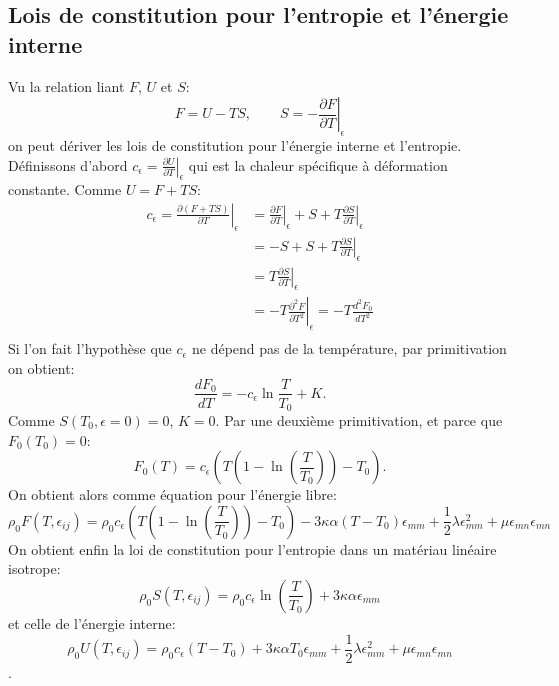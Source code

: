 \subsection{Lois de constitution pour l'entropie et l'énergie interne}
Vu la relation liant $F$, $U$ et $S$:
$$F= U-TS,\qquad S=-\left.\frac{\partial F}{\partial T}\right|_\epsilon$$
on peut dériver les lois de constitution pour l'énergie interne et l'entropie. Définissons d'abord $c_\epsilon=\left.\frac{\partial U}{\partial T}\right|_\epsilon$ qui est la chaleur spécifique à déformation constante. Comme $U=F+TS$:
\begin{align*}
c_{\epsilon}=\left.\frac{\partial (F+TS)}{\partial T}\right|_{\epsilon}&=\left.\frac{\partial F}{\partial T}\right|_{\epsilon}+S+T\left.\frac{\partial S}{\partial T}\right|_\epsilon\\
 &=-S+S+T\left.\frac{\partial S}{\partial T}\right|_\epsilon\\
 &=T\left.\frac{\partial S}{\partial T}\right|_{\epsilon}\\
 &=-T\left.\frac{\partial^2 F}{\partial T^2}\right|_{\epsilon}=-T\frac{d^2F_0}{dT^2}\\
\end{align*}
Si l'on fait l'hypothèse que $c_{\epsilon}$ ne dépend pas de la température, par primitivation on obtient:
$$\frac{dF_0}{dT}=-c_{\epsilon}\ln{\frac{T}{T_0}}+K.$$ Comme $S(T_0,\epsilon=0)=0$, $K=0$. Par une deuxième primitivation, et parce que $F_0(T_0)=0$:
$$F_0(T)=c_{\epsilon}\left(T\left(1-\ln\left(\frac{T}{T_0}\right)\right)-T_0\right).$$
On obtient alors comme équation pour l'énergie libre:
$$\rho_0F(T,\epsilon_{ij})=\rho_0c_{\epsilon}\left(T\left(1-\ln\left(\frac{T}{T_0}\right)\right)-T_0\right)-3\kappa\alpha(T-T_0)\epsilon_{mm}+\frac{1}{2}\lambda\epsilon_{mm}^2+\mu\epsilon_{mn}\epsilon_{mn}$$
On obtient enfin la loi de constitution pour l'entropie dans un matériau linéaire isotrope:
$$\boxed{\rho_0S(T,\epsilon_{ij})=\rho_0c_{\epsilon}\ln\left(\frac{T}{T_0}\right)+3\kappa\alpha\epsilon_{mm}}$$
et celle de l'énergie interne:
$$\boxed{\rho_0U(T,\epsilon_{ij})=\rho_0c_\epsilon(T-T_0)+3\kappa\alpha T_0\epsilon_{mm}+\frac{1}{2}\lambda \epsilon_{mm}^2+\mu\epsilon_{mn}\epsilon_{mn}}$$.
